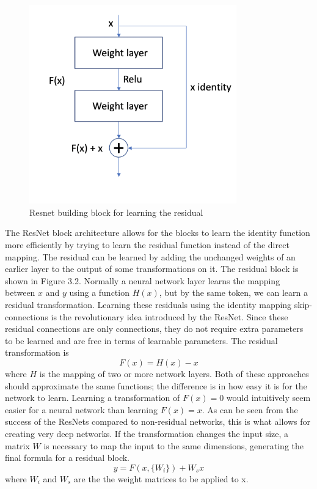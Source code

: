 \begin{figure}[h!] 
\centering 
\includegraphics[width=0.8\textwidth]{imgs/resnet-block-own.png}
\caption{Resnet building block for learning the residual \citep{resNet}}
\end{figure}

The ResNet block architecture allows for the blocks to learn the identity function more efficiently by trying to learn the residual function instead of the direct mapping. The residual can be learned by adding the unchanged weights of an earlier layer to the output of some transformations on it.
The residual block is shown in Figure 3.2.
Normally a neural network layer learns the mapping between ${x}$ and ${y}$ using a function ${H(x)}$, but by the same token, we can learn a residual transformation.
Learning these residuals using the identity mapping skip-connections is the revolutionary idea introduced by the ResNet.
Since these residual connections are only connections, they do not require extra parameters to be learned and are free in terms of learnable parameters.
The residual transformation is
\[{F(x) = H(x) - x}\] \noindent where ${H}$ is the mapping of two or more network layers. Both of these approaches should approximate the same functions; the difference is in how easy it is for the network to learn. Learning a transformation of ${F(x) = 0}$ would intuitively seem easier for a neural network than learning ${F(x) = x}$. As can be seen from the success of the ResNets compared to non-residual networks, this is what allows for creating very deep networks. If the transformation changes the input size, a matrix ${W}$ is necessary to map the input to the same dimensions, generating the final formula for a residual block. \[y = F(x, \{W_i\}) + W_s x\] \noindent where $W_i$ and $W_s$ are the the weight matrices to be applied to x.

